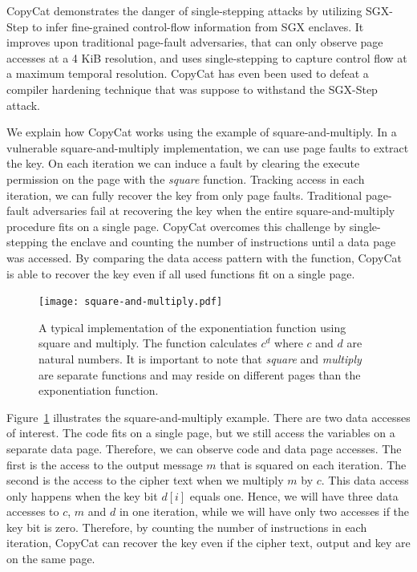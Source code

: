 \documentclass{llncs}
\begin{document}
CopyCat \cite{MoghimiBHPS20} demonstrates the danger of single-stepping attacks
by utilizing SGX-Step to infer fine-grained control-flow information from SGX enclaves.
It improves upon traditional page-fault adversaries,
that can only observe page accesses at a 4 KiB resolution,
and uses single-stepping to capture control flow at a maximum temporal resolution.
CopyCat has even been used to defeat a compiler hardening technique \cite{HosseinzadehLLP18} that was
suppose to withstand the SGX-Step attack.

We explain how CopyCat works using the example of square-and-multiply.
In a vulnerable square-and-multiply implementation,
we can use page faults to extract the key.
On each iteration we can induce a fault by clearing the execute permission on
the page with the \emph{square} function.
Tracking access in each iteration, we can fully recover the key from only page faults.
Traditional page-fault adversaries fail at recovering the key when the entire
square-and-multiply procedure fits on a single page.
CopyCat overcomes this challenge by single-stepping the enclave and counting the
number of instructions until a data page was accessed.
By comparing the data access pattern with the function, CopyCat is able to recover the key
even if all used functions fit on a single page.

\begin{figure}[t!]
  \centering
  \texttt{[image: square-and-multiply.pdf]}
  \caption{A typical implementation of the exponentiation function using square and multiply.
    The function calculates $c^d$ where $c$ and $d$ are natural numbers.
    It is important to note that \emph{square} and \emph{multiply} are separate functions
    and may reside on different pages than the exponentiation function.}
  \label{fig:square-and-multiply}
\end{figure}

Figure~\ref{fig:square-and-multiply} illustrates the square-and-multiply example.
There are two data accesses of interest. The code fits on a single page, but we still access the variables on a separate data page. Therefore, we can observe code and data page accesses.
The first is the access to the output message $m$ that is squared on each iteration.
The second is the access to the cipher text when we multiply $m$ by $c$.
This data access only happens when the key bit $d[i]$ equals one.
Hence, we will have three data accesses to $c$, $m$ and $d$ in one iteration,
while we will have only two accesses if the key bit is zero.
Therefore, by counting the number of instructions in each iteration,
CopyCat can recover the key even if the cipher text, output and key are on the same page.
\end{document}
